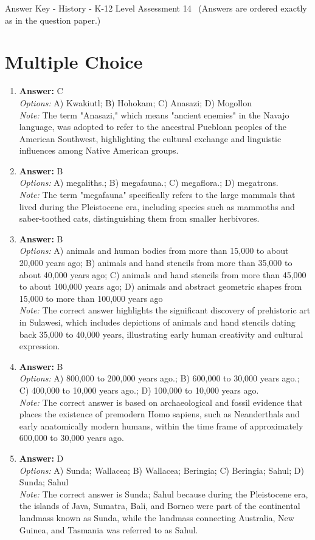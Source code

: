 \documentclass[12pt]{article}
\begin{document}
\begin{center}
Answer Key - History - K-12 Level Assessment 14 \
\small (Answers are ordered exactly as in the question paper.)
\end{center}

\section*{Multiple Choice}
\begin{enumerate}[label=\arabic*.]
\item \textbf{Answer:} C
\\ \textit{Options:} A) Kwakiutl; B) Hohokam; C) Anasazi; D) Mogollon
\\ \textit{Note:} The term "Anasazi," which means "ancient enemies" in the Navajo language, was adopted to refer to the ancestral Puebloan peoples of the American Southwest, highlighting the cultural exchange and linguistic influences among Native American groups.
\item \textbf{Answer:} B
\\ \textit{Options:} A) megaliths.; B) megafauna.; C) megaflora.; D) megatrons.
\\ \textit{Note:} The term "megafauna" specifically refers to the large mammals that lived during the Pleistocene era, including species such as mammoths and saber-toothed cats, distinguishing them from smaller herbivores.
\item \textbf{Answer:} B
\\ \textit{Options:} A) animals and human bodies from more than 15,000 to about 20,000 years ago; B) animals and hand stencils from more than 35,000 to about 40,000 years ago; C) animals and hand stencils from more than 45,000 to about 100,000 years ago; D) animals and abstract geometric shapes from 15,000 to more than 100,000 years ago
\\ \textit{Note:} The correct answer highlights the significant discovery of prehistoric art in Sulawesi, which includes depictions of animals and hand stencils dating back 35,000 to 40,000 years, illustrating early human creativity and cultural expression.
\item \textbf{Answer:} B
\\ \textit{Options:} A) 800,000 to 200,000 years ago.; B) 600,000 to 30,000 years ago.; C) 400,000 to 10,000 years ago.; D) 100,000 to 10,000 years ago.
\\ \textit{Note:} The correct answer is based on archaeological and fossil evidence that places the existence of premodern Homo sapiens, such as Neanderthals and early anatomically modern humans, within the time frame of approximately 600,000 to 30,000 years ago.
\item \textbf{Answer:} D
\\ \textit{Options:} A) Sunda; Wallacea; B) Wallacea; Beringia; C) Beringia; Sahul; D) Sunda; Sahul
\\ \textit{Note:} The correct answer is Sunda; Sahul because during the Pleistocene era, the islands of Java, Sumatra, Bali, and Borneo were part of the continental landmass known as Sunda, while the landmass connecting Australia, New Guinea, and Tasmania was referred to as Sahul.
\end{enumerate}
\end{document}
